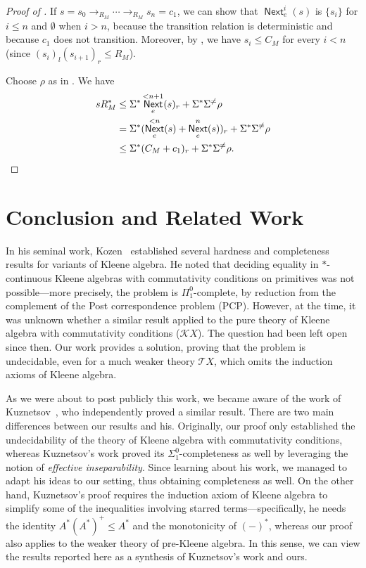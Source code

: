 \documentclass[a4paper,UKenglish,cleveref, autoref, thm-restate]{lipics-v2021}
\DeclareMathOperator{\Next}{\mathsf{Next}}
\begin{document}
\begin{proof}[Proof of ]
  If $s = s_0  \to _{R_M}  \cdots   \to _{R_M} s_n = c_1$, we can show that $\Next_e^i(s)$ is
  $\{s_i\}$ for $i  \leq  n$ and $ \emptyset $ when $i > n$, because the transition relation is
  deterministic and because $c_1$ does not transition.  Moreover, by
  , we have $s_i  \leq  C_M$ for every $i < n$
  (since $(s_i)_l(s_{i+1})_r  \leq  R_M$).

  Choose $ \rho $ as in . We have
  \begin{align*}
    sR_M^*
    &  \leq   \Sigma ^*\Next_e^{<n+1}(s)_r +  \Sigma ^* \Sigma ^{ \neq } \rho  \\
    & =  \Sigma ^*(\Next_e^{<n}(s) + \Next_e^n(s))_r +  \Sigma ^* \Sigma ^{ \neq } \rho  \\
    &  \leq   \Sigma ^*(C_M + c_1)_r +  \Sigma ^* \Sigma ^{ \neq } \rho . \qedhere
  \end{align*}
\end{proof}

\section{Conclusion and Related Work}
\label{sec:conclusion}

In his seminal work, Kozen~\cite{DBLP:conf/lics/Kozen97} established several
hardness and completeness results for variants of Kleene algebra.  He noted that
deciding equality in $*$-continuous Kleene algebras with commutativity
conditions on primitives was not possible---more precisely, the problem is
$ \Pi _1^0$-complete, by reduction from the complement of the Post
correspondence problem (PCP).  However, at the time, it was unknown whether a
similar result applied to the pure theory of Kleene algebra with commutativity
conditions ($\mathcal{K}X$).  The question had been left open since then. Our
work provides a solution, proving that the problem is undecidable, even for a
much weaker theory $\mathcal{T}X$, which omits the induction axioms of Kleene
algebra.

As we were about to post publicly this work, we became aware of the work of
Kuznetsov~\cite{Kuznetsov23}, who independently proved a similar result.  There
are two main differences between our results and his.  Originally, our proof
only established the undecidability of the theory of Kleene algebra with
commutativity conditions, whereas Kuznetsov's work proved its
$\Sigma^0_1$-completeness as well by leveraging the notion of \emph{effective
  inseparability}.  Since learning about his work, we managed to adapt his ideas
to our setting, thus obtaining completeness as well.  On the other hand,
Kuznetsov's proof requires the induction axiom of Kleene algebra to simplify
some of the inequalities involving starred terms---specifically, he needs the
identity $A^*(A^*)^+ \leq A^*$ and the monotonicity of $(-)^*$, whereas our
proof also applies to the weaker theory of pre-Kleene algebra.  In this sense,
we can view the results reported here as a synthesis of Kuznetsov's work and
ours.
\end{document}
